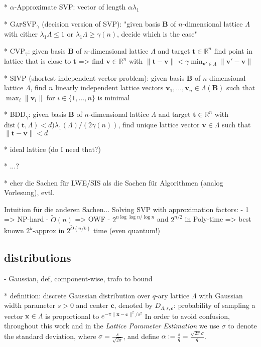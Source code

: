 \documentclass[
  a4paper,  %
  twoside,  %
  bibliography=totoc,
  headsepline,
  cleardoublepage=empty,
  parskip=half,
  draft=false
]{scrbook}
\begin{document}
  * $\alpha$-Approximate SVP: vector of length $\alpha \lambda_1$

  * \textsc{GapSVP}$_\gamma$ (decision version of \textsc{SVP}): "given basis $\textbf{B}$ of $n$-dimensional lattice $\Lambda$ with either $\lambda_1{\Lambda} \leq 1$ or $\lambda_1{\Lambda} \geq \gamma(n)$, decide which is the case" %

  * CVP$_\gamma$: given  basis $\textbf{B}$ of $n$-dimensional lattice $\Lambda$ and target $\textbf{t}\in\mathbb{R}^n$ find point in lattice that is close to $\textbf{t}$ => find  $\textbf{v} \in \mathbb{R}^n$ with $\|\textbf{t} - \textbf{v}\| < \gamma \min_{\textbf{v}' \in \Lambda} \|\textbf{v}' - \textbf{v}\|$

  * \textsc{SIVP} (shortest independent vector problem): given  basis $\textbf{B}$ of $n$-dimensional lattice $\Lambda$, find $n$ linearly independent lattice vectors $\textbf{v}_1, \ldots, \textbf{v}_n \in \Lambda(\textbf{B})$ such that $\max_i \|\textbf{v}_i\|$ for $i \in \{1, \ldots, n\}$ is minimal

  * BDD$_\gamma$: given basis $\textbf{B}$ of $n$-dimensional lattice $\Lambda$ and target $\textbf{t}\in\mathbb{R}^n$ with $\text{dist}(\textbf{t}, \Lambda) < d ) \lambda_1(\Lambda)/(2\gamma(n))$, find unique lattice vector $\textbf{v} \in \Lambda$ such that $\|\textbf{t} - \textbf{v} \| < d$ %

  * ideal lattice (do I need that?)

  * ...?

  * eher die Sachen für LWE/SIS als die Sachen für Algorithmen (analog Vorlesung), evtl. 
  
  Intuition für die anderen Sachen...
  Solving SVP with approximation factors: %
        - 1 => NP-hard \cite{Ajt98}
        - $\tilde{O}(n)$ => OWF \cite{Ajt96, MR04}
        - $2^{n \log \log n / \log n}$ and $2^{n/2}$ in Poly-time \cite{LLL82}
        => best known $2^k$-approx in $2^{\tilde{O}(n/k)}$ time (even quantum!)


\subsection{distributions}

  - Gaussian, def, component-wise, trafo to bound %

    * definition:
      discrete Gaussian distribution over $q$-ary lattice $\Lambda$ with Gaussian width parameter $s > 0$ and center $\textbf{c}$, denoted by $D_{\Lambda, s, \textbf{c}}$: probability of sampling a vector $\textbf{x}\in \Lambda$ is proportional to $e^{-\pi \|\textbf{x} - \textbf{c}\|^2/s^2}$ %
      In order to avoid confusion, throughout this work and in the \textit{Lattice Parameter Estimation} we use $\sigma$ to denote the standard deviation, where $\sigma = \frac{s}{\sqrt{2 \pi}}$, and define $\alpha := \frac{s}{q} = \frac{\sqrt{2\pi} \sigma}{q}$. 
\end{document}
